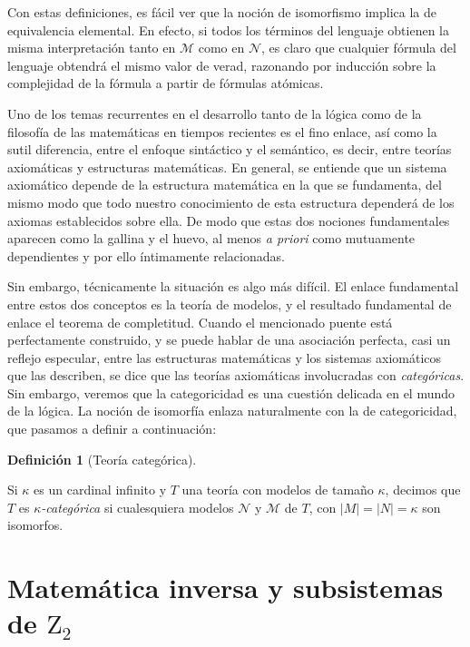 \documentclass[11pt,a4paper]{book}
\theoremstyle{plain}
\theoremstyle{definition}
\newtheorem{definicion}[teorema]{Definición}
\theoremstyle{remark}
\begin{document}
Con estas definiciones, es fácil ver que la noción de isomorfismo implica la de equivalencia elemental. En efecto, si todos los términos del lenguaje obtienen la misma interpretación tanto en $\mathcal{M}$ como en $\mathcal{N}$, es claro que cualquier fórmula del lenguaje obtendrá el mismo valor de verad, razonando por inducción sobre la complejidad de la fórmula a partir de fórmulas atómicas.

Uno de los temas recurrentes en el desarrollo tanto de la lógica como de la filosofía de las matemáticas en tiempos recientes es el fino enlace, así como la sutil diferencia, entre el enfoque sintáctico y el semántico, es decir, entre teorías axiomáticas y estructuras matemáticas. En general, se entiende que un sistema axiomático depende de la estructura matemática en la que se fundamenta, del mismo modo que todo nuestro conocimiento de esta estructura dependerá de los axiomas establecidos sobre ella. De modo que estas dos nociones fundamentales aparecen como la gallina y el huevo, al menos \textit{a priori} como mutuamente dependientes y por ello íntimamente relacionadas.

Sin embargo, técnicamente la situación es algo más difícil. El enlace fundamental entre estos dos conceptos es la teoría de modelos, y el resultado fundamental de enlace el teorema de completitud. Cuando el mencionado puente está perfectamente construido, y se puede hablar de una asociación perfecta, casi un reflejo especular, entre las estructuras matemáticas y los sistemas axiomáticos que las describen, se dice que las teorías axiomáticas involucradas con \textit{categóricas}. Sin embargo, veremos que la categoricidad es una cuestión delicada en el mundo de la lógica. La noción de isomorfía enlaza naturalmente con la de categoricidad, que pasamos a definir a continuación:

\begin{definicion}[Teoría categórica] \label{def-categoricidad}

  Si $\kappa$ es un cardinal infinito y $T$ una teoría con modelos de tamaño $\kappa$, decimos que $T$ es \textit{$\kappa$-categórica} si cualesquiera modelos $\mathcal{N}$ y $\mathcal{M}$ de $T$, con $|M|=|N|=\kappa$ son isomorfos.
 
\end{definicion}



\chapter{Matemática inversa y subsistemas de \texorpdfstring{$\mathrm{Z}_2$}{Z2}}
\end{document}
